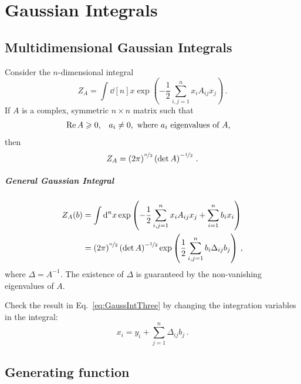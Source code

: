 \documentclass[notes.tex]{subfiles}
\begin{document}
\chapter{Gaussian Integrals}
\label{chap:lec0}

\section{Multidimensional Gaussian Integrals}
\label{sec:mult-gauss-integr}

Consider the $n$-dimensional integral
\begin{equation}
  \label{eq:GaussIntOne}
  Z_A = \int \dd[n]{x} \exp\left(
  -\frac12 \sum_{i,j=1}^n x_i A_{ij} x_j
  \right)\, .
\end{equation}
If $A$ is a complex, symmetric $n\times n$ matrix such that
\begin{align}
  \Re A & \geqslant 0,                                               &
  a_i   & \neq 0, \text{ where } a_i\ \text{eigenvalues of } A,
\end{align}
then
\begin{equation}
  \label{eq:GaussIntTwo}
  Z_A = \left(2\pi\right)^{\nicefrac{n}{2}} \left(\det A \right)^{-\nicefrac{1}{2}}\, .
\end{equation}

\paragraph{General Gaussian Integral}

\begin{align}
  Z_A(b) & = \int \dd[n]{x} \exp\left(
  -\frac12 \sum_{i,j=1}^n x_i A_{ij} x_j
  + \sum_{i=1}^n b_i x_i
  \right)                                                                                 \\
  \label{eq:GaussIntThree}
         & =  \left(2\pi\right)^{\nicefrac{n}{2}} \left(\det A \right)^{-\nicefrac{1}{2}}
  \exp\left(
  \frac12 \sum_{i,j=1}^n b_i \Delta_{ij} b_j
  \right) \, ,
\end{align}
where $\Delta = A^{-1}$. The existence of $\Delta$ is guaranteed by the non-vanishing eigenvalues of $A$.
\begin{Ex}
  Check the result in Eq.~\ref{eq:GaussIntThree} by changing the integration variables in the integral:
  \[
    x_i = y_i + \sum_{j=1}^n \Delta_{ij} b_j\, .
  \]
\end{Ex}

\section{Generating function}
\label{sec:generating-function}
\end{document}
